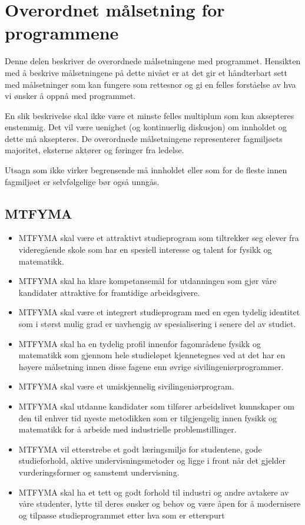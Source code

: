 \section{Overordnet målsetning for programmene}

Denne delen beskriver de overordnede målsetningene med programmet. Hensikten med å beskrive målsetningene på dette nivået er at det gir et håndterbart sett med målsetninger som kan fungere som rettesnor og gi en felles forståelse av hva vi ønsker å oppnå med programmet.

En slik beskrivelse skal ikke være et minste felles multiplum som kan aksepteres enstemmig. Det vil være uenighet (og kontinuerlig diskusjon) om innholdet og dette må aksepteres. De overordnede målsetningene representerer fagmiljøets majoritet, eksterne aktører og føringer fra ledelse. 

Utsagn som ikke virker begrensende må innholdet eller som for de fleste innen fagmiljøet er selvfølgelige bør også unngås.

\subsection{MTFYMA}

\begin{itemize}
	\item MTFYMA skal være et attraktivt studieprogram som tiltrekker seg elever fra videregående skole som har en spesiell interesse og talent for fysikk og matematikk.
	\item MTFYMA skal ha klare kompetansemål for utdanningen som gjør våre kandidater attraktive for framtidige arbeidsgivere.
	\item MTFYMA skal være et integrert studieprogram med en egen tydelig identitet som i størst mulig grad er uavhengig av spesialisering i senere del av studiet.
	\item MTFYMA skal ha en tydelig profil innenfor fagområdene fysikk og matematikk som gjennom hele studieløpet kjennetegnes ved at det har en høyere målsetning innen disse fagene enn øvrige sivilingeniørprogrammer.
	\item MTFYMA skal være et umiskjennelig sivilingeniørprogram.
	\item MTFYMA skal utdanne kandidater som tilfører arbeidslivet kunnskaper om den til enhver tid nyeste metodikken som er tilgjengelig innen fysikk og matematikk for å arbeide med industrielle problemstillinger.
	\item MTFYMA vil etterstrebe et godt læringsmiljø for studentene, gode studieforhold, aktive undervisningsmetoder og ligge i front når det gjelder vurderingsformer og samstemt undervisning.
	\item MTFYMA skal ha et tett og godt forhold til industri og andre avtakere av våre studenter, lytte til deres ønsker og behov og være åpen for å modernisere og tilpasse studieprogrammet etter hva som er etterspurt
\end{itemize}

